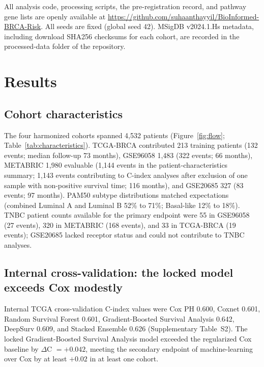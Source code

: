 \documentclass[11pt,letterpaper]{article}
\begin{document}
All analysis code, processing scripts, the pre-registration record, and pathway gene lists are openly available at \url{https://github.com/suhaanthayyil/BioInformed-BRCA-Risk}. All seeds are fixed (global seed 42). MSigDB v2024.1.Hs metadata, including download SHA256 checksums for each cohort, are recorded in the processed-data folder of the repository.


\section*{Results}

\subsection*{Cohort characteristics}

The four harmonized cohorts spanned 4,532 patients (Figure~\ref{fig:flow}; Table~\ref{tab:characteristics}). TCGA-BRCA contributed 213 training patients (132 events; median follow-up 73 months), GSE96058 1,483 (322 events; 66 months), METABRIC 1,980 evaluable (1,144 events in the patient-characteristics summary; 1,143 events contributing to C-index analyses after exclusion of one sample with non-positive survival time; 116 months), and GSE20685 327 (83 events; 97 months). PAM50 subtype distributions matched expectations (combined Luminal A and Luminal B 52\% to 71\%; Basal-like 12\% to 18\%). TNBC patient counts available for the primary endpoint were 55 in GSE96058 (27 events), 320 in METABRIC (168 events), and 33 in TCGA-BRCA (19 events); GSE20685 lacked receptor status and could not contribute to TNBC analyses.

\subsection*{Internal cross-validation: the locked model exceeds Cox modestly}

Internal TCGA cross-validation C-index values were Cox PH 0.600, Coxnet 0.601, Random Survival Forest 0.601, Gradient-Boosted Survival Analysis 0.642, DeepSurv 0.609, and Stacked Ensemble 0.626 (Supplementary Table~S2). The locked Gradient-Boosted Survival Analysis model exceeded the regularized Cox baseline by $\Delta$C $= +0.042$, meeting the secondary endpoint of machine-learning over Cox by at least $+0.02$ in at least one cohort.
\end{document}
